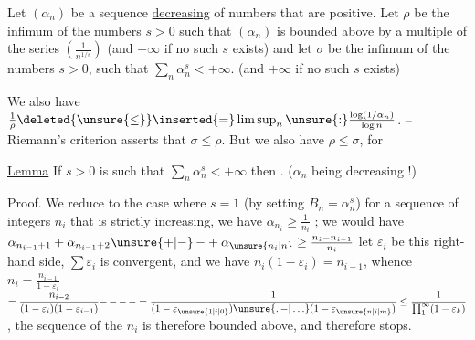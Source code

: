 Let $(\alpha_n)$ be a sequence \uline{decreasing}  of numbers
that are positive. Let $\rho$ be the infimum of the numbers
 $s>0$ such that $(\alpha_n)$ is bounded above by
a multiple of the series $\left(\frac{1}{n^{1/s}}\right)$ (and $+\infty$
if no such $s$ exists) and let $\sigma$ be the
infimum of the numbers $s>0$, such that
$\sum_n\alpha_n^s<+\infty$. (and $+\infty$ if no such $s$ exists)

We also have $\frac1\rho\deleted{\unsure{\leq}}\inserted{=}\limsup_n\unsure{:}\frac{\log(1/\alpha_n)}{\log n}$.  -- Riemann's criterion asserts
that \deleted{$\unsure{\rho\leq|\rho\leq\sigma}$} $\sigma\leq\rho$. But we also have $\rho\leq\sigma$,
for 

\uline{Lemma} \quad If $s>0$ is such that $\sum_n\alpha_n^s<+\infty$
then \inserted{$\geq$}  . ($\alpha_n$ being decreasing !)

Proof. We reduce to the case where $s=1$
(by setting $B_n=\alpha_n^s$)   for a sequence
of integers $n_i$ that is strictly increasing, we  have
$\alpha_{n_i}\geq\frac1{n_i}$ ;  we would have \quad $\alpha_{n_{i-1}+1}+\alpha_{n_{i-1}+2}\unsure{+|\mathord{-}}\,\mathord{-}+\alpha_{\unsure{n_i|n}}\geq\frac{n_i-n_{i-1}}{n_i}$
let $\varepsilon_i$ be this right-hand side, $\sum\varepsilon_i$ is 
convergent, and we have $n_i(1-\varepsilon_i)=n_{i-1}$, whence $n_i=\frac{n_{i-1}}{1-\varepsilon_i}$
$\displaystyle =\frac{n_{i-2}}{(1-\varepsilon_i)(1-\varepsilon_{i-1})}\mathord{-}\,\mathord{-}\,\mathord{-}\,\mathord{-}=\frac1{(1-\varepsilon_{\unsure{1|i|0}})\unsure{\mathord{.}\,\mathord{-}|\ldots}(1-\varepsilon_{\unsure{n|i|m}})}\leq\frac1{\prod_1^\infty(1-\varepsilon_k)}$, the sequence
of the $n_i$ is therefore bounded above, and therefore stops.
